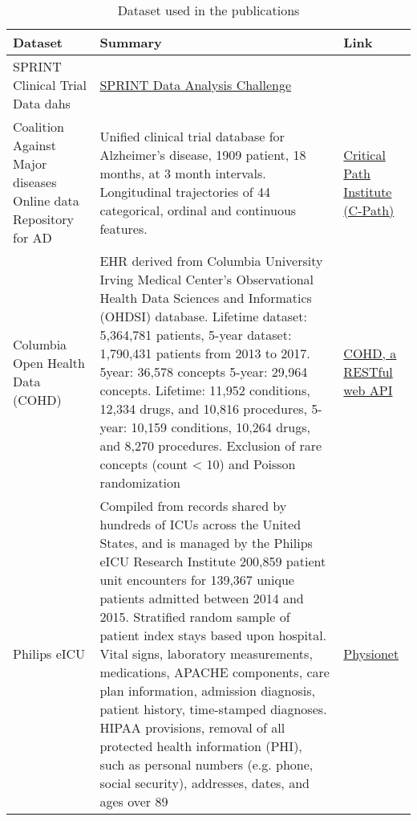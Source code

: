 \begin{table}[H]
    \scriptsize
    \caption{Dataset used in the publications\label{tab:datasets}}
    \begin{tabular}{@{}p{} p{}p{}@{}}\toprule
    Dataset & Summary & Link\\\midrule
    
    SPRINT Clinical Trial Data \cite{wright2016randomized} 
dahs    & \href{https://challenge.nejm.org/pages/home}{SPRINT Data Analysis Challenge}\\
    
    Coalition Against Major diseases Online data Repository for AD \cite{Neville_2015} 
    & Unified clinical trial database for Alzheimer’s disease, 1909 patient, 18 months, at 3 month intervals. Longitudinal trajectories of 44 categorical, ordinal and continuous features. 
    & \href{https://c-path.org/programs/dcc/projects/alzheimers-disease/coalition-against-major-diseases-consortium-database-camd-admci/}{Critical Path Institute (C-Path)}\\
    
    Columbia Open Health Data (COHD) \cite{Ta_2018} &  EHR derived from Columbia University Irving Medical Center’s Observational Health Data Sciences and Informatics (OHDSI) database. Lifetime dataset: 5,364,781 patients, 5-year dataset: 1,790,431 patients from 2013 to 2017. 5year: 36,578 concepts 5-year: 29,964 concepts. Lifetime: 11,952 conditions, 12,334 drugs, and 10,816 procedures, 5-year: 10,159 conditions, 10,264 drugs, and 8,270 procedures.  Exclusion of rare concepts (count < 10) and Poisson randomization  & \href{http://cohd.io/}{COHD, a RESTful web API}\\

    Philips eICU \cite{pollard2018eicu} &    Compiled from records shared by hundreds of ICUs across the United States, and is managed by the Philips eICU Research Institute  200,859 patient unit encounters for 139,367 unique patients admitted between 2014 and 2015. Stratified random sample of patient index stays based upon hospital. Vital signs, laboratory measurements, medications, APACHE components, care plan information, admission diagnosis, patient history, time-stamped diagnoses.  HIPAA provisions, removal of all protected health information (PHI), such as personal numbers (e.g. phone, social security), addresses, dates, and ages over 89  & \href{https://physionet.org}{Physionet \cite{Goldberger_2000}}\\
    

\end{tabular}
\end{table}
